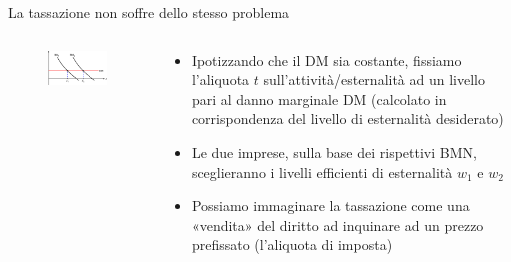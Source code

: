 \documentclass[aspectratio=64,11pt]{beamer}
\begin{document}
\begin{frame}{La tassazione non soffre dello stesso problema}
\begin{columns}
\begin{column}{.5\columnwidth}
\begin{figure}[htbp]
\centering
\includegraphics[width=\textwidth]{./figure/esternalita-9-color.pdf}
\end{figure}
\end{column}
\begin{column}{.5\columnwidth}
\begin{itemize}
\item Ipotizzando che il DM sia costante, fissiamo l'aliquota $t$
sull'attività/esternalità ad un livello pari al danno marginale DM
(calcolato in corrispondenza del livello di esternalità desiderato)
\item Le due imprese, sulla base dei rispettivi BMN, sceglieranno i livelli
efficienti di esternalità $w_1$ e $w_2$
\item Possiamo immaginare la tassazione come una «vendita» del diritto ad
inquinare ad un prezzo prefissato (l'aliquota di imposta)
\end{itemize}
\end{column}
\end{columns}
\end{frame}
\end{document}
